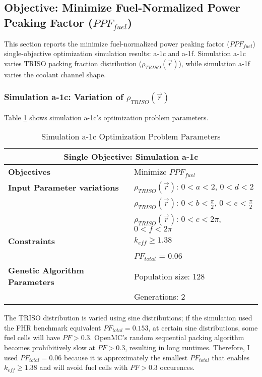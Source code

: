 \subsection{Objective: Minimize Fuel-Normalized Power Peaking Factor ($PPF_{fuel}$)}
\label{sec:assem-1-obj-ppf}
This section reports the minimize fuel-normalized power peaking factor 
($PPF_{fuel}$) single-objective optimization simulation results: a-1c and a-1f. 
Simulation a-1c varies \gls{TRISO} packing fraction distribution 
($\rho_{TRISO}(\vec{r})$), while simulation a-1f varies the coolant channel shape.

\subsubsection{Simulation a-1c: Variation of $\rho_{TRISO}(\vec{r})$}
Table \ref{tab:simulationa1c} shows simulation a-1c's optimization problem parameters. 
\begin{table}[htbp!]
    \centering
    \onehalfspacing
    \caption{Simulation a-1c Optimization Problem Parameters}
	\label{tab:simulationa1c}
    \footnotesize
    \begin{tabular}{l|p{5.3cm}}
    \hline 
    \multicolumn{2}{c}{\textbf{Single Objective: Simulation a-1c}} \\
    \hline 
    \textbf{Objectives} & Minimize $PPF_{fuel}$ \\
    \hline 
    \textbf{Input Parameter variations}
    & $\rho_{TRISO}(\vec{r})$: $0<a<2$, $0<d<2$\\
    & $\rho_{TRISO}(\vec{r})$: $0<b<\frac{\pi}{2}$, $0<e<\frac{\pi}{2}$\\
    & $\rho_{TRISO}(\vec{r})$: $0<c<2\pi$, $0<f<2\pi$\\
    \hline
    \textbf{Constraints} & $k_{eff} \geq 1.38$\\ 
    & $PF_{total}$ = 0.06 \\
    \hline 
    \textbf{Genetic Algorithm Parameters} & Population size: 128 \\
    & Generations: 2 \\
    \hline
    \end{tabular}
\end{table}
The TRISO distribution is varied using sine distributions; if the simulation used 
the FHR benchmark equivalent $PF_{total} = 0.153$, at certain sine distributions, 
some fuel cells will have $PF > 0.3$. 
OpenMC's random sequential packing algorithm becomes prohibitively slow at $PF > 0.3$, 
resulting in long runtimes. 
Therefore, I used $PF_{total} = 0.06$ because it is approximately the smallest 
$PF_{total}$ that enables $k_{eff} \geq 1.38$ and will avoid fuel cells with 
$PF > 0.3$ occurences. 

